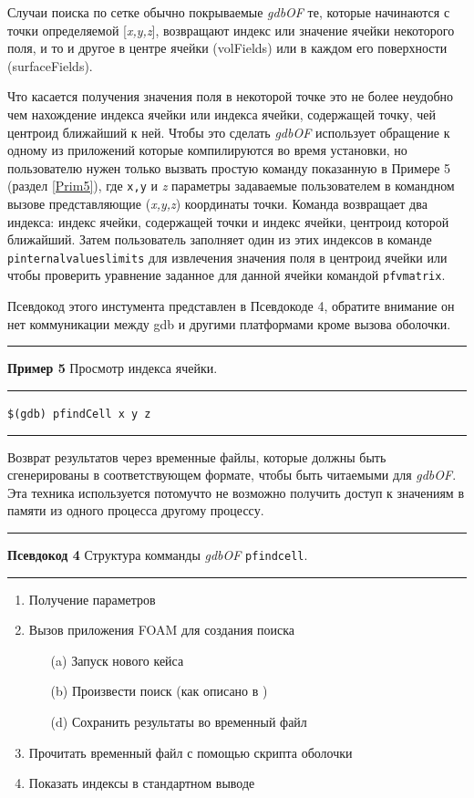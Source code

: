 \documentclass[a4paper,10pt]{book}
\begin{document}
Случаи поиска по сетке обычно покрываемые \textit{gdbOF} те, которые начинаются с точки определяемой [\textit{x,y,z}],
возвращают индекс или значение ячейки некоторого поля, и то и другое в центре ячейки (volFields) или в каждом его поверхности (surfaceFields).

Что касается получения значения поля в некоторой точке это не более неудобно чем нахождение индекса ячейки или индекса ячейки, содержащей
точку, чей центроид ближайший к ней. Чтобы это сделать \textit{gdbOF} использует обращение к одному из приложений которые компилируются
во время установки, но пользователю нужен только вызвать простую команду показанную в Примере 5 (раздел \ref{Prim5}), где \texttt{x,y} и \textit{z} параметры
задаваемые пользователем в командном вызове представляющие (\textit{x,y,z}) координаты точки. Команда возвращает два индекса: индекс ячейки,
содержащей точки и индекс ячейки, центроид которой ближайший. Затем пользователь заполняет один из этих индексов в команде
 \texttt{pinternalvalueslimits} для извлечения значения поля в центроид ячейки или чтобы проверить уравнение заданное для данной ячейки
командой \texttt{pfvmatrix}.

Псевдокод этого инстумента представлен в Псевдокоде 4, обратите внимание он нет коммуникации между gdb и другими платформами кроме
вызова оболочки.

\vspace{2 mm}
\hrule\smallskip
\textbf{Пример 5}\label{Prim5} Просмотр индекса ячейки.
\smallskip\hrule
\vspace{2 mm}

\texttt{\$(gdb) pfindCell x y z}

\vspace{2 mm}
\smallskip\hrule
\vspace{5 mm}

Возврат результатов через временные файлы, которые должны быть сгенерированы в соответствующем формате, чтобы быть читаемыми для \textit{gdbOF}.
Эта техника используется потомучто не возможно получить доступ к значениям в памяти из одного процесса другому процессу.

\vspace{2 mm}
\hrule\smallskip
\textbf{Псевдокод 4}\label{Prim5} Структура комманды \textit{gdbOF} \texttt{pfindcell}.
\smallskip\hrule
\vspace{2 mm}

{\begin{enumerate}
        \item Получение параметров
	\item Вызов приложения FOAM для создания поиска
	\begin{enumerate}
		\item[(a)] Запуск нового кейса
		\item[(b)] Произвести поиск (как описано в )
		\item[(d)] Сохранить результаты во временный файл
	\end{enumerate}
	\item Прочитать временный файл с помощью скрипта оболочки
	\item Показать индексы в стандартном выводе
        \end{enumerate}
} 
\end{document}
